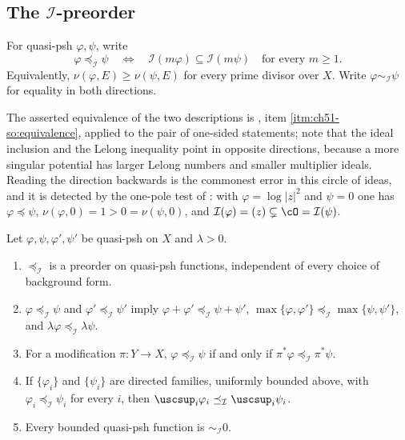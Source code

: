 \subsection{The \texorpdfstring{\(\mathcal I\)}{I}-preorder}
\label{sec:ch51-i-preorder}

\begin{definition}
\label{def:complex-i-preorder}
For quasi-psh \(\varphi,\psi\), write
\[
 \varphi\preceq_{\mathcal I}\psi
 \quad\Longleftrightarrow\quad
 \mathcal I(m\varphi)\subseteq\mathcal I(m\psi)
 \quad\text{for every }m\geq1.
\tag{51.27}\label{eq:complex-i-preorder}
\]
Equivalently, \(\nu(\varphi,E)\geq\nu(\psi,E)\) for every prime divisor
over \(X\).  Write \(\varphi\sim_{\mathcal I}\psi\) for equality in both
directions.
\end{definition}

The asserted equivalence of the two descriptions is
, item
\cref{itm:ch51-so:equivalence}, applied to the pair of one-sided
statements; note that the ideal inclusion and the Lelong inequality point
in opposite directions, because a more singular potential has larger
Lelong numbers and smaller multiplier ideals.  Reading the direction
backwards is the commonest error in this circle of ideas, and it is
detected by the one-pole test of : with
\(\varphi=\log|z|^2\) and \(\psi=0\) one has
\(\varphi\preceq\psi\), \(\nu(\varphi,0)=1>0=\nu(\psi,0)\), and
\(\mathcal I(\varphi)=(z)\subsetneq\cO=\mathcal I(\psi)\).

\begin{proposition}
\label{prop:ch51-i-calculus}
Let \(\varphi,\psi,\varphi',\psi'\) be quasi-psh on \(X\) and
\(\lambda>0\).
\begin{enumerate}
\item\label{itm:ch51-ic:preorder}
      \(\preceq_{\mathcal I}\) is a preorder on quasi-psh functions,
      independent of every choice of background form.
\item\label{itm:ch51-ic:sum}
      \(\varphi\preceq_{\mathcal I}\psi\) and
      \(\varphi'\preceq_{\mathcal I}\psi'\) imply
      \(\varphi+\varphi'\preceq_{\mathcal I}\psi+\psi'\),
      \(\max\{\varphi,\varphi'\}\preceq_{\mathcal I}
      \max\{\psi,\psi'\}\), and
      \(\lambda\varphi\preceq_{\mathcal I}\lambda\psi\).
\item\label{itm:ch51-ic:pullback}
      For a modification \(\pi:Y\to X\),
      \(\varphi\preceq_{\mathcal I}\psi\) if and only if
      \(\pi^*\varphi\preceq_{\mathcal I}\pi^*\psi\).
\item\label{itm:ch51-ic:increasing}
      If \(\{\varphi_i\}\) and \(\{\psi_i\}\) are directed families,
      uniformly bounded above, with
      \(\varphi_i\preceq_{\mathcal I}\psi_i\) for every \(i\), then
      \(\uscsup_i\varphi_i\preceq_{\mathcal I}\uscsup_i\psi_i\).
\item\label{itm:ch51-ic:bounded}
      Every bounded quasi-psh function is \(\sim_{\mathcal I}0\).
\end{enumerate}
\end{proposition}

